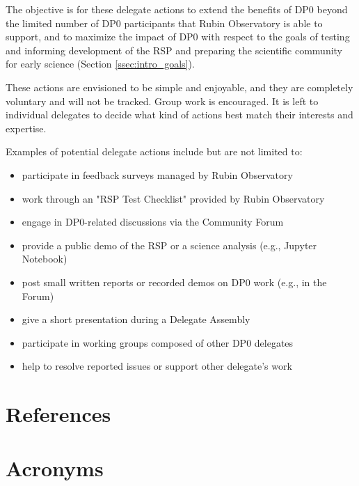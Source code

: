 \documentclass[DM,lsstdraft,authoryear,toc]{lsstdoc}
\begin{document}
The objective is for these delegate actions to extend the benefits of DP0 beyond the limited number of DP0 participants that Rubin Observatory is able to support, and to maximize the impact of DP0 with respect to the goals of testing and informing development of the RSP and preparing the scientific community for early science (Section \ref{ssec:intro_goals}). 

These actions are envisioned to be simple and enjoyable, and they are completely voluntary and will not be tracked.
Group work is encouraged.
It is left to individual delegates to decide what kind of actions best match their interests and expertise. 

Examples of potential delegate actions include but are not limited to:
\begin{itemize}
\item participate in feedback surveys managed by Rubin Observatory
\item work through an "RSP Test Checklist" provided by Rubin Observatory
\item engage in DP0-related discussions via the Community Forum
\item provide a public demo of the RSP or a science analysis (e.g., Jupyter Notebook)
\item post small written reports or recorded demos on DP0 work (e.g., in the Forum)
\item give a short presentation during a Delegate Assembly
\item participate in working groups composed of other DP0 delegates
\item help to resolve reported issues or support other delegate's work
\end{itemize}


\appendix
\section{References} \label{sec:bib}
\renewcommand{\refname}{} %


\section{Acronyms}



% 
\end{document}
